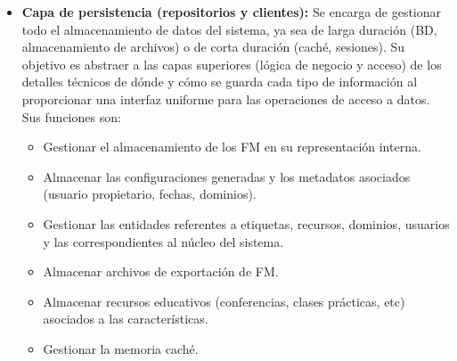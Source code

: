 \begin{itemize}
    \item \textbf{Capa de persistencia (repositorios y clientes):} Se encarga de gestionar todo el 
	almacenamiento de datos del sistema, ya sea de larga duración (\ac{BD}, almacenamiento de 
	archivos) o de corta duración (caché, sesiones). Su objetivo es abstraer a las capas superiores 
	(lógica de negocio y acceso) de los detalles técnicos de dónde y cómo se guarda cada tipo de 
	información al proporcionar una interfaz uniforme para las operaciones de acceso a datos. Sus funciones son:
    \begin{itemize}
        \item Gestionar el almacenamiento de los \ac{FM} en su representación interna.
        \item Almacenar las configuraciones generadas y los metadatos asociados (usuario propietario, fechas, dominios).
        \item Gestionar las entidades referentes a etiquetas, recursos, dominios, usuarios y las correspondientes al núcleo del sistema.
        \item Almacenar archivos de exportación de \ac{FM}.
        \item Almacenar recursos educativos (conferencias, clases prácticas, etc) asociados a las características.
        \item Gestionar la memoria caché.
    \end{itemize}


\end{itemize}
